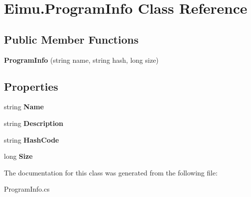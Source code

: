 \hypertarget{class_eimu_1_1_program_info}{
\section{Eimu.ProgramInfo Class Reference}
\label{class_eimu_1_1_program_info}
}
\subsection*{Public Member Functions}
\begin{DoxyCompactItemize}
\item 
\hypertarget{class_eimu_1_1_program_info_a4cf048f65bd6a6c7384412dba8fa1950}{
{\bfseries ProgramInfo} (string name, string hash, long size)}
\label{class_eimu_1_1_program_info_a4cf048f65bd6a6c7384412dba8fa1950}

\end{DoxyCompactItemize}
\subsection*{Properties}
\begin{DoxyCompactItemize}
\item 
\hypertarget{class_eimu_1_1_program_info_a3cfb22da35f783d9081ee3accb5e8b84}{
string {\bfseries Name}}
\label{class_eimu_1_1_program_info_a3cfb22da35f783d9081ee3accb5e8b84}

\item 
\hypertarget{class_eimu_1_1_program_info_a202fe6a2d0f513ccb7c399fa16fb5d72}{
string {\bfseries Description}}
\label{class_eimu_1_1_program_info_a202fe6a2d0f513ccb7c399fa16fb5d72}

\item 
\hypertarget{class_eimu_1_1_program_info_a691144a504090bead3f7e4cb6c557a4e}{
string {\bfseries HashCode}}
\label{class_eimu_1_1_program_info_a691144a504090bead3f7e4cb6c557a4e}

\item 
\hypertarget{class_eimu_1_1_program_info_a6b267e324651d9cd1afe7a37ad614d03}{
long {\bfseries Size}}
\label{class_eimu_1_1_program_info_a6b267e324651d9cd1afe7a37ad614d03}

\end{DoxyCompactItemize}


The documentation for this class was generated from the following file:\begin{DoxyCompactItemize}
\item 
ProgramInfo.cs\end{DoxyCompactItemize}
